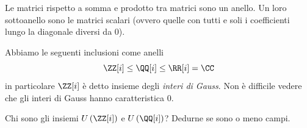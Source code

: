 \documentclass[11pt]{scrartcl}
\begin{document}
	\begin{example}[Matrici]
		Le matrici rispetto a somma e prodotto tra matrici sono un anello. Un loro sottoanello sono le matrici scalari (ovvero quelle con tutti e soli i coefficienti lungo la diagonale diversi da $0$).
	\end{example}
	\begin{example}
		Abbiamo le seguenti inclusioni come anelli
		$$\ZZ[i]\le \QQ[i]\le \RR[i]=\CC$$
		in particolare $\ZZ[i]$ è detto insieme degli \textit{interi di Gauss}. Non è difficile vedere che gli interi di Gauss hanno caratteristica $0$.
	\end{example}
	\begin{exercise}
		Chi sono gli insiemi $U\left(\ZZ[i]\right)$ e $U\left(\QQ[i]\right)$? Dedurne se sono o meno campi.
	\end{exercise}
	
\end{document}
